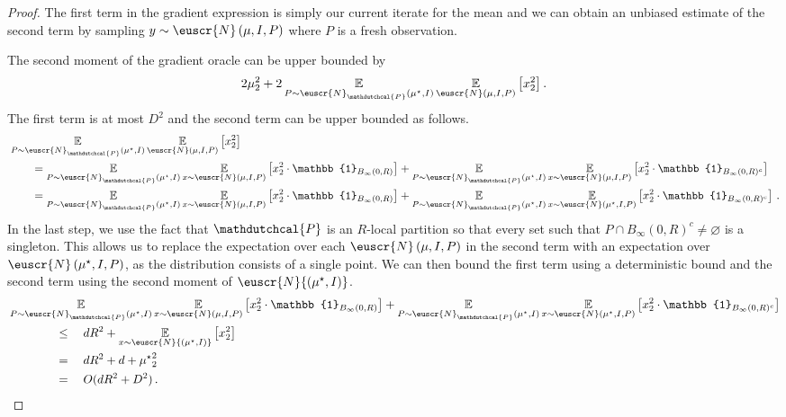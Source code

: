 \documentclass[11pt,letterpaper]{article}
\newcommand{\ones}{\mathbb{1}}
\theoremstyle{plain}
\theoremstyle{definition}
\theoremstyle{remark}
\newcommand{\inparen}[1]{\ensuremath{\left(#1\right)}}
\newcommand{\insquare}[1]{\ensuremath{\left[#1\right]}}
\let\norm\relax
\newcommand{\norm}[1]{\ensuremath{\left\lVert #1 \right\rVert}}
\newcommand{\E}{\operatornamewithlimits{\mathbb{E}}}
\newcommand{\Ex}{\E}
\newcommand{\customcal}[1]{\euscr{#1}}
\newcommand{\cN}{\customcal{N}}
\newcommand{\hypo}[1]{\mathdutchcal{#1}}
\newcommand{\hyP}{\hypo{P}}
\newcommand{\normal}[2]{\cN{\inparen{#1,#2}}}
\newcommand{\coarseNormal}[3]{\cN_{#3}\inparen{#1,#2}}
\newcommand{\truncatedNormal}[3]{\cN\inparen{#1,#2,#3}}
\newcommand{\muStar}{{\mu^\star}}
\begin{document}
{{{    \begin{proof}
        The first term in the gradient expression is simply our current iterate for the mean
        and we can obtain an unbiased estimate of the second term by sampling $y\sim \truncatedNormal{\mu}{I}{P}$
        where $P$ is a fresh observation.

        The second moment of the gradient oracle can be upper bounded by
        \[
            2\norm{\mu}_2^2 
            +
            2\Ex_{P\sim \coarseNormal{\muStar}{I}{\hyP}}
            {
                \Ex_{\truncatedNormal{\mu}{I}{P}}\insquare{
                    \norm{x}_2^2
                }
            }\,.
        \]
        The first term is at most $D^2$
        and the second term can be upper bounded as follows.
        \begin{align*}
            &\Ex_{P\sim \coarseNormal{\muStar}{I}{\hyP}}
            {
                \Ex_{\truncatedNormal{\mu}{I}{P}}\insquare{
                    \norm{x}_2^2
                }
            } \\
            &\qquad= \E_{P\sim \coarseNormal{\muStar}{I}{\hyP}} \E_{x\sim \truncatedNormal{\mu}{I}{P}} \insquare{\norm{x}_2^2\cdot \ones_{B_\infty(0, R)}}
            + \E_{P\sim \coarseNormal{\muStar}{I}{\hyP}} \E_{x\sim \truncatedNormal{\mu}{I}{P}} \insquare{\norm{x}_2^2\cdot \ones_{B_\infty(0, R)^c}} \\
            &\qquad= \E_{P\sim \coarseNormal{\muStar}{I}{\hyP}} \E_{x\sim \truncatedNormal{\mu}{I}{P}} \insquare{\norm{x}_2^2\cdot \ones_{B_\infty(0, R)}}
            + \E_{P\sim \coarseNormal{\muStar}{I}{\hyP}} \E_{x\sim \truncatedNormal{\muStar}{I}{P}} \insquare{\norm{x}_2^2\cdot \ones_{B_\infty(0, R)^c}}\,.
        \end{align*}
        {In the last step,
        we use the fact that $\hyP$ is an $R$-local partition so that every set 
        such that $P\cap B_\infty(0, R)^c\neq \varnothing$ is a singleton.
        This allows us to replace the expectation over each $\truncatedNormal{\mu}{I}{P}$
        in the second term
        with an expectation over $\truncatedNormal{\muStar}{I}{P}$,
        as the distribution consists of a single point.}
        We can then bound the first term using a deterministic bound
        and the second term using the second moment of $\normal{\muStar}{I}$.
        \begin{align*}
            &\E_{P\sim \coarseNormal{\muStar}{I}{\hyP}} \E_{x\sim \truncatedNormal{\mu}{I}{P}} \insquare{\norm{x}_2^2\cdot \ones_{B_\infty(0, R)}}
            + \E_{P\sim \coarseNormal{\muStar}{I}{\hyP}} \E_{x\sim \truncatedNormal{\muStar}{I}{P}} \insquare{\norm{x}_2^2\cdot \ones_{B_\infty(0, R)^c}}  \\
            &\qquad\qquad\leq\quad  dR^2 + \E_{x\sim \normal{\muStar}{I}}\insquare{\norm{x}_2^2} \\
            &\qquad\qquad=\quad  dR^2 + d + \norm{\muStar}_2^2 \\
            &\qquad\qquad=\quad  O(dR^2 + D^2)\,.
        \end{align*}
    \end{proof}

}}}
\end{document}
